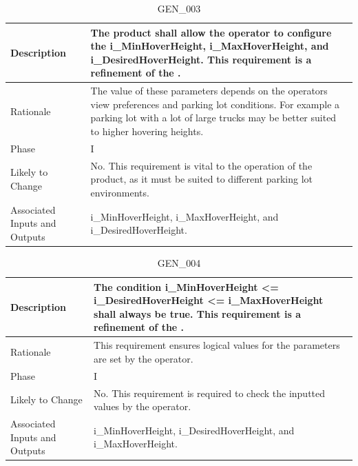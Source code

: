 \documentclass{article}
\begin{document}
\begin{table}[!h]
\begin{center}
\caption {GEN\_003} 
\label{GEN_003}
\begin{tabular}{ | m{3cm} | m{11cm} | } 
\hline
Description & The product shall allow the operator to configure the i\_MinHoverHeight, i\_MaxHoverHeight, and i\_DesiredHoverHeight. This requirement is a refinement of the \nameref{Configure State}. \\
\hline
Rationale & The value of these parameters depends on the operators view preferences and parking lot conditions. For example a parking lot with a lot of large trucks may be better suited to higher hovering heights. \\
\hline
Phase & I \\
\hline
Likely to Change & No. This requirement is vital to the operation of the product, as it must be suited to different parking lot environments. \\
\hline
Associated Inputs and Outputs & i\_MinHoverHeight, i\_MaxHoverHeight, and i\_DesiredHoverHeight. \\
\hline
\end{tabular}
\end{center}
\end{table}

\begin{table}[!h]
\begin{center}
\caption {GEN\_004} 
\label{GEN_004}
\begin{tabular}{ | m{3cm} | m{11cm} | } 
\hline
Description & The condition i\_MinHoverHeight <= i\_DesiredHoverHeight <= i\_MaxHoverHeight shall always be true. This requirement is a refinement of the \nameref{Configure State}. \\
\hline
Rationale & This requirement ensures logical values for the parameters are set by the operator. \\
\hline
Phase & I \\
\hline
Likely to Change & No. This requirement is required to check the inputted values by the operator. \\
\hline
Associated Inputs and Outputs & i\_MinHoverHeight, i\_DesiredHoverHeight, and i\_MaxHoverHeight. \\
\hline
\end{tabular}
\end{center}
\end{table}
\end{document}
